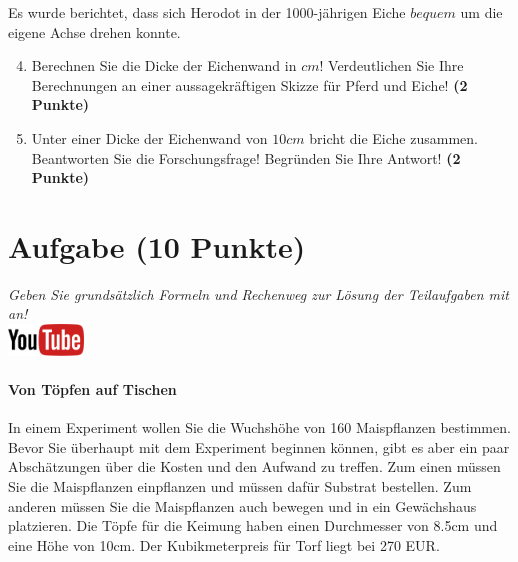 \documentclass[a4paper, 9pt]{scrartcl}\usepackage[]{graphicx}\usepackage[]{xcolor}
\begin{document}
Es wurde berichtet, dass sich Herodot in der 1000-j{\"a}hrigen Eiche
$bequem$ um die eigene Achse drehen konnte.

\begin{enumerate}
  \setcounter{enumi}{3}
\item Berechnen Sie die Dicke der Eichenwand in $cm$! Verdeutlichen Sie Ihre
  Berechnungen an einer aussagekr{\"a}ftigen Skizze f{\"u}r Pferd und Eiche! \textbf{(2 Punkte)} 
\item Unter einer Dicke der Eichenwand von $10cm$ bricht
  die Eiche zusammen. Beantworten Sie die Forschungsfrage! Begr{\"u}nden Sie
  Ihre Antwort! \textbf{(2 Punkte)} 
\end{enumerate}
 
\clearpage

\section{Aufgabe \hfill (10 Punkte)}

\textit{Geben Sie grunds{\"a}tzlich Formeln und Rechenweg zur L{\"o}sung der
  Teilaufgaben mit an!} \\[1Ex]

\hfill\href{https://youtu.be/57B-yYoFSk0}{\includegraphics[width =
  2cm]{img/youtube}} %
\hspace{2Ex}

\paragraph{Von T{\"o}pfen auf Tischen}



In einem Experiment wollen Sie die Wuchsh{\"o}he von 160
Maispflanzen bestimmen. Bevor Sie {\"u}berhaupt mit dem Experiment beginnen
k{\"o}nnen, gibt es aber ein paar Absch{\"a}tzungen {\"u}ber die Kosten und den Aufwand
zu treffen. Zum einen m{\"u}ssen Sie die Maispflanzen einpflanzen und m{\"u}ssen
daf{\"u}r Substrat bestellen. Zum anderen m{\"u}ssen Sie die Maispflanzen auch
bewegen und in ein Gew{\"a}chshaus platzieren. Die T{\"o}pfe f{\"u}r die Keimung haben
einen Durchmesser von 8.5cm und eine H{\"o}he von 10cm. Der
Kubikmeterpreis f{\"u}r Torf liegt bei 270 EUR.
\end{document}
